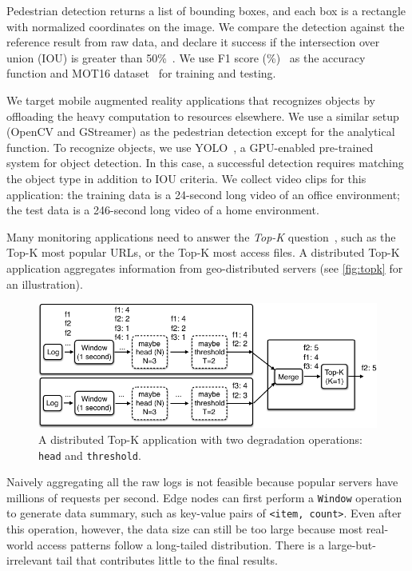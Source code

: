 Pedestrian detection returns a list of bounding boxes, and each box is a
rectangle with normalized coordinates on the image. We compare the detection
against the reference result from raw data, and declare it success if the
intersection over union (IOU) is greater than
50\%~\cite{everingham2010pascal}. We use F1 score
(\%)~\cite{Rijsbergen:1979:IR:539927} as the accuracy function and MOT16
dataset~\cite{milan2016mot16} for training and testing.

 We target mobile augmented reality applications
that recognizes objects by offloading the heavy computation to resources
elsewhere.
We use a similar setup (OpenCV and GStreamer) as the pedestrian detection except
for the analytical function. To recognize objects, we use YOLO~\cite{darknet13,
  redmon2016yolo9000}, a GPU-enabled pre-trained system for object detection. In
this case, a successful detection requires matching the object type in addition
to IOU criteria. We collect video clips for this application: the training data is a 24-second long video of an office environment; the test data is a 246-second long video of a home environment.

 Many monitoring applications need to answer the
\textit{Top-K} question~\cite{babcock2003distributed}, such as the Top-K most
popular URLs, or the Top-K most access files. A distributed Top-K application
aggregates information from geo-distributed servers (see \autoref{fig:topk} for
an illustration).

\begin{figure}
  \centering
  \includegraphics[width=\columnwidth]{figures/topk.pdf}
  \caption{A distributed Top-K application with two degradation operations:
    \texttt{head} and \texttt{threshold}.}
  \label{fig:topk}
\end{figure}

Naively aggregating all the raw logs is not feasible because popular servers
have millions of requests per second. Edge nodes can first perform a
\texttt{Window} operation to generate data summary, such as key-value pairs of
\texttt{<item, count>}. Even after this operation, however, the data size can
still be too large because most real-world access patterns follow a long-tailed
distribution. There is a large-but-irrelevant tail that contributes little to
the final results.

